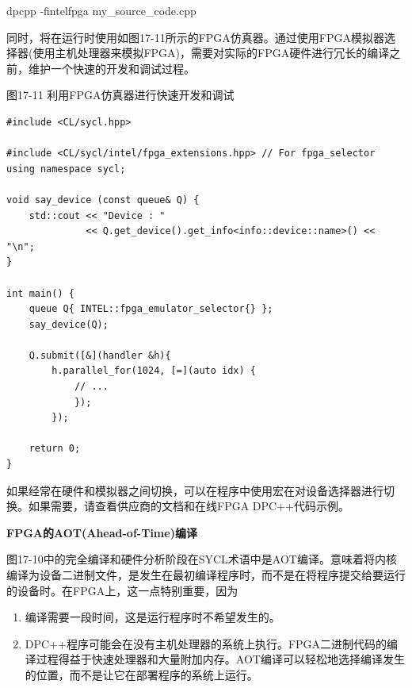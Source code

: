\begin{tcolorbox}[colback=white,colframe=black]
dpcpp -fintelfpga my\_source\_code.cpp
\end{tcolorbox}

同时，将在运行时使用如图17-11所示的FPGA仿真器。通过使用FPGA模拟器选择器(使用主机处理器来模拟FPGA)，需要对实际的FPGA硬件进行冗长的编译之前，维护一个快速的开发和调试过程。\par

\hspace*{\fill} \par %
图17-11 利用FPGA仿真器进行快速开发和调试
\begin{lstlisting}[caption={}]
#include <CL/sycl.hpp>

#include <CL/sycl/intel/fpga_extensions.hpp> // For fpga_selector
using namespace sycl;

void say_device (const queue& Q) {
	std::cout << "Device : "
			  << Q.get_device().get_info<info::device::name>() << "\n";
}

int main() {
	queue Q{ INTEL::fpga_emulator_selector{} };
	say_device(Q);
	
	Q.submit([&](handler &h){
		h.parallel_for(1024, [=](auto idx) {
			// ...
			});
		});

	return 0;
}
\end{lstlisting}

如果经常在硬件和模拟器之间切换，可以在程序中使用宏在对设备选择器进行切换。如果需要，请查看供应商的文档和在线FPGA DPC++代码示例。\par

\hspace*{\fill} \par %
\textbf{FPGA的AOT(Ahead-of-Time)编译}

图17-10中的完全编译和硬件分析阶段在SYCL术语中是AOT编译。意味着将内核编译为设备二进制文件，是发生在最初编译程序时，而不是在将程序提交给要运行的设备时。在FPGA上，这一点特别重要，因为\par

\begin{enumerate}
	\item 编译需要一段时间，这是运行程序时不希望发生的。
	\item DPC++程序可能会在没有主机处理器的系统上执行。FPGA二进制代码的编译过程得益于快速处理器和大量附加内存。AOT编译可以轻松地选择编译发生的位置，而不是让它在部署程序的系统上运行。
\end{enumerate}

